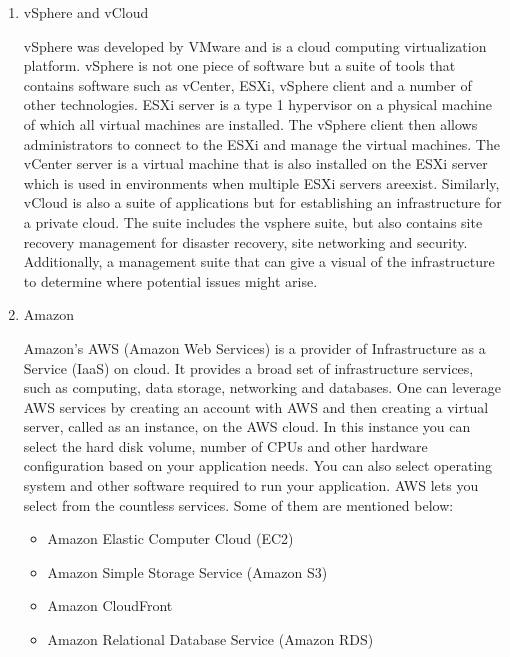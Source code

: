 \begin{enumerate}
\item {} 
vSphere and vCloud

vSphere was developed by VMware and is a cloud computing
virtualization platform. \label{\detokenize{i524/technologies:id652}}{\hyperref[\detokenize{i524/technologies:www-vmware}]{\sphinxcrossref{{[}565{]}}}}  vSphere is not
one piece of software but a suite of tools that contains software
such as vCenter, ESXi, vSphere client and a number of other
technologies.  ESXi server is a type 1 hypervisor on a physical
machine of which all virtual machines are installed.
The vSphere client then allows administrators to connect to
the ESXi and manage the virtual machines.  The vCenter server
is a virtual machine that is also installed on the
ESXi server which is used in environments when multiple ESXi
servers areexist.  Similarly, vCloud is also a suite of
applications but for establishing an infrastructure for a
private cloud. \label{\detokenize{i524/technologies:id653}}{\hyperref[\detokenize{i524/technologies:www-mustbegeek}]{\sphinxcrossref{{[}566{]}}}}  The suite includes the
vsphere suite, but also contains site recovery management for
disaster recovery,  site networking and security.  Additionally,
a management suite that can give a visual of the infrastructure
to determine where potential issues might arise.

\item {} 
Amazon

Amazon’s AWS (Amazon Web Services) is a provider of
Infrastructure as a Service (IaaS) on cloud. It provides a broad
set of infrastructure services, such as computing, data storage,
networking and databases.  One can leverage AWS services by
creating an account with AWS and then creating a virtual server,
called as an instance, on the AWS cloud.  In this instance you
can select the hard disk volume, number of CPUs and other
hardware configuration based on your application needs.  You can
also select operating system and other software required to run
your application. AWS lets you select from the countless
services.  Some of them are mentioned below:
\begin{itemize}
\item {} 
Amazon Elastic Computer Cloud (EC2)

\item {} 
Amazon Simple Storage Service (Amazon S3)

\item {} 
Amazon CloudFront

\item {} 
Amazon Relational Database Service (Amazon RDS)


\end{itemize}
\end{enumerate}

